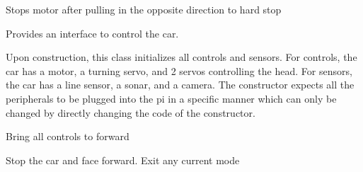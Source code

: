 \documentclass[letterpaper,10pt,english]{sphinxmanual}
\begin{document}
\begin{fulllineitems}
\begin{fulllineitems}
\end{fulllineitems}


\begin{fulllineitems}
\label{\detokenize{index:picar.Motor.stop}}
Stops motor after pulling in the opposite direction to hard stop

\end{fulllineitems}


\end{fulllineitems}


\begin{fulllineitems}
\label{\detokenize{index:picar.PiCar}}
Provides an interface to control the car.

Upon construction, this class initializes all controls and sensors.
For controls, the car has a motor, a turning servo, and 2 servos controlling the head.
For sensors, the car has a line sensor, a sonar, and a camera.
The constructor expects all the peripherals to be plugged into the pi in a specific manner which can only be changed by directly changing the code of the constructor.

\begin{fulllineitems}
\label{\detokenize{index:picar.PiCar.all_ahead}}
Bring all controls to forward

\end{fulllineitems}


\begin{fulllineitems}
\label{\detokenize{index:picar.PiCar.all_stop}}
Stop the car and face forward. Exit any current mode

\end{fulllineitems}



\end{fulllineitems}
\end{document}
